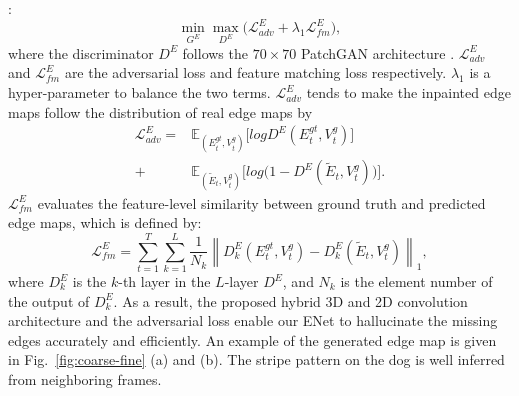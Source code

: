 :
%
\begin{equation}
	\label{eq:loss_e_}
	\min\limits_{G^E} \max \limits_{D^E} \big(\mathcal{L}^E_{adv}+\lambda_1 \mathcal{L}^E_{fm}\big),
\end{equation}
%
where the discriminator $D^E$ follows the $70\times 70$ PatchGAN architecture \cite{Isola_2017_CVPR}. 
$\mathcal{L}^E_{adv}$ and $\mathcal{L}^E_{fm}$ are the adversarial loss and feature matching loss respectively. 
$\lambda_1$ is a hyper-parameter to balance the two terms.
%
$\mathcal{L}^E_{adv}$ tends to make the inpainted edge maps follow the distribution of real edge maps by
\begin{equation} \label{eq:edge_adver}
	\begin{aligned} 
		\mathcal{L}^E_{adv}  =&\mathbb{E}_{({E}_t^{gt},{V}_t^{g})}\big[logD^E({E}_t^{gt},{V}_t^{g})\big]\\ 
		+&\mathbb{E}_{({\widetilde{E}_t},{V}_t^{g})}\big[log\big(1-D^E ( {\widetilde{E}_t},{V}_t^{g})\big)\big].
	\end{aligned}
\end{equation}
% 
$\mathcal{L}^E_{fm}$ evaluates the feature-level similarity between ground truth and predicted edge maps, which is defined by:
\begin{equation}
	\label{eq:edge_fm}
	\mathcal{L}^E_{fm}=\sum_{t=1}^T\sum_{k=1}^L{\frac{1}{N_k}\left\| D^E_k({E}_t^{gt},{V}_t^{g})- D^E_k({\widetilde{E}_t},{V}_t^{g})\right\|_1},
\end{equation}
where $D^E_k$ is the $k$-th layer in the $L$-layer $D^E$, and $N_k$ is the element number of the output of $D^E_k$.
As a result, the proposed hybrid 3D and 2D convolution architecture and the adversarial loss enable our ENet to hallucinate the missing edges accurately and efficiently.
An example of the generated edge map is given in Fig.~\ref{fig:coarse-fine} (a) and (b). 
The stripe pattern on the dog is well inferred from neighboring frames. 




